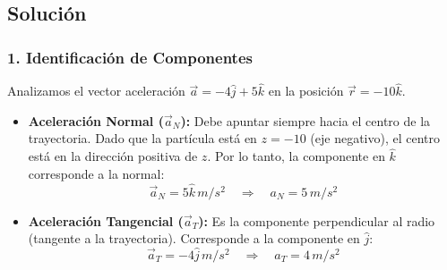 \documentclass[12pt, a4paper]{article}
\begin{document}
\begin{center}
\end{center}

\subsection*{Solución}

\subsubsection*{1. Identificación de Componentes}
Analizamos el vector aceleración $\vec{a} = -4\hat{j} + 5\hat{k}$ en la posición $\vec{r} = -10\hat{k}$.

\begin{itemize}
    \item \textbf{Aceleración Normal ($\vec{a}_N$):} Debe apuntar siempre hacia el centro de la trayectoria. Dado que la partícula está en $z = -10$ (eje negativo), el centro está en la dirección positiva de $z$. Por lo tanto, la componente en $\hat{k}$ corresponde a la normal:
    $$ \vec{a}_N = 5\hat{k} \, \si{m/s^2} \quad \Rightarrow \quad a_N = 5 \, \si{m/s^2} $$
    
    \item \textbf{Aceleración Tangencial ($\vec{a}_T$):} Es la componente perpendicular al radio (tangente a la trayectoria). Corresponde a la componente en $\hat{j}$:
    $$ \vec{a}_T = -4\hat{j} \, \si{m/s^2} \quad \Rightarrow \quad a_T = 4 \, \si{m/s^2} $$
\end{itemize}
\end{document}
